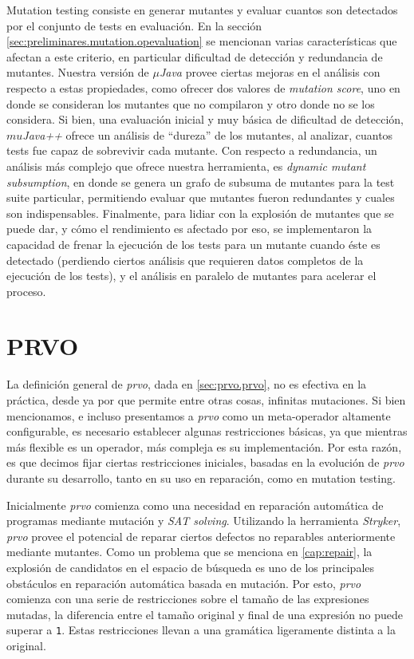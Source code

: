 Mutation testing consiste en generar mutantes y evaluar cuantos son detectados por el conjunto de tests en evaluaci\'on. En la secci\'on \ref{sec:preliminares.mutation.opevaluation} se mencionan varias caracter\'isticas que afectan a este criterio, en particular dificultad de detecci\'on y redundancia de mutantes. Nuestra versi\'on de \emph{$\mu$Java} provee ciertas mejoras en el an\'alisis con respecto a estas propiedades, como ofrecer dos valores de \emph{mutation score}, uno en donde se consideran los mutantes que no compilaron y otro donde no se los considera. Si bien, una evaluaci\'on inicial y muy b\'asica de dificultad de detecci\'on, \emph{$mu$Java++} ofrece un an\'alisis de ``dureza'' de los mutantes, al analizar, cuantos tests fue capaz de sobrevivir cada mutante. Con respecto a redundancia, un an\'alisis m\'as complejo que ofrece nuestra herramienta, es \emph{dynamic mutant subsumption}, en donde se genera un grafo de subsuma de mutantes para la test suite particular, permitiendo evaluar que mutantes fueron redundantes y cuales son indispensables. Finalmente, para lidiar con la explosi\'on de mutantes que se puede dar, y c\'omo el rendimiento es afectado por eso, se implementaron la capacidad de frenar la ejecuci\'on de los tests para un mutante cuando \'este es detectado (perdiendo ciertos an\'alisis que requieren datos completos de la ejecuci\'on de los tests), y el an\'alisis en paralelo de mutantes para acelerar el proceso.

\section{PRVO}
\label{sec:implementation.prvo}

La definici\'on general de \emph{prvo}, dada en \ref{sec:prvo.prvo}, no es efectiva en la pr\'actica, desde ya por que permite entre otras cosas, infinitas mutaciones. Si bien mencionamos, e incluso presentamos a \emph{prvo} como un meta-operador altamente configurable, es necesario establecer algunas restricciones b\'asicas, ya que mientras m\'as flexible es un operador, m\'as compleja es su implementaci\'on. Por esta raz\'on, es que decimos fijar ciertas restricciones iniciales, basadas en la evoluci\'on de \emph{prvo} durante su desarrollo, tanto en su uso en reparaci\'on, como en mutation testing.

Inicialmente \emph{prvo} comienza como una necesidad en reparaci\'on autom\'atica de programas mediante mutaci\'on y \emph{SAT solving}. Utilizando la herramienta \emph{Stryker}, \emph{prvo} provee el potencial de reparar ciertos defectos no reparables anteriormente mediante mutantes. Como un problema que se menciona en \ref{cap:repair}, la explosi\'on de candidatos en el espacio de b\'usqueda es uno de los principales obst\'aculos en reparaci\'on autom\'atica basada en mutaci\'on. Por esto, \emph{prvo} comienza con una serie de restricciones sobre el tama\~no de las expresiones mutadas, la diferencia entre el tama\~no original y final de una expresi\'on no puede superar a \texttt{1}. Estas restricciones llevan a una gram\'atica ligeramente distinta a la original.

